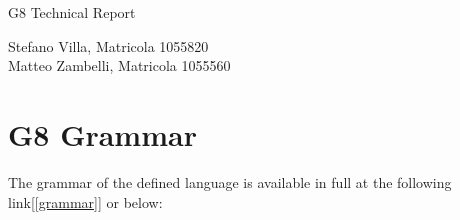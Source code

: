 \documentclass[a4paper]{article}
\begin{document}
\vspace{3\baselineskip}

\begin{center}
\begin{Huge}
G8 Technical Report
\end{Huge}
\end{center}

\vspace{3\baselineskip}

\begin{Large}
\begin{center}
Stefano Villa, Matricola 1055820\\
Matteo Zambelli, Matricola 1055560
\end{center}
\end{Large}

\newpage
\tableofcontents
\newpage

\section{G8 Grammar}


The grammar of the defined language is available in full at the following link[\ref{grammar}] or below:
\end{document}
